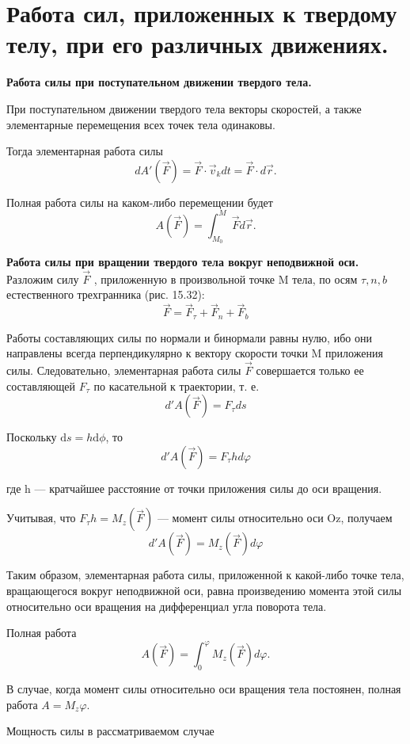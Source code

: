 {\section{Работа сил, приложенных к твердому телу, при его различных движениях.}
\begin{center}
    \par \textbf{Работа  силы  при  поступательном  движении  твердого тела.}
    \par При  поступательном движении твердого тела векторы скоростей, а также элементарные перемещения всех точек тела одинаковы.
    \par Тогда элементарная работа силы
        $${dA}'(\vec{F}) = \vec F\cdot\vec v_kdt = \vec F \cdot d\vec r.$$
    \par Полная работа силы на каком-либо перемещении будет
        $$A(\vec F) = \int_{M_0}^{M} \vec F d \vec r.$$
    \par \textbf{Работа силы при вращении твердого тела вокруг неподвижной оси.} Разложим силу $\vec F$ , приложенную в произвольной точке M тела, по осям $\tau, n, b$ естественного трехгранника (рис. 15.32):
        $$\vec F = \vec F_\tau + \vec F_n + \vec F_b$$
    \par Работы составляющих силы по нормали и бинормали равны нулю, ибо они направлены всегда перпендикулярно к вектору скорости точки M приложения силы. Следовательно, элементарная работа силы $\vec{F}$  совершается только ее составляющей $F_{\tau}$ по касательной к траектории, т. е. 
        $$d'A(\vec F) = F_\tau ds$$
    \par Поскольку $\mathrm{d}s=h\mathrm{d}\phi$, то
        $$d'A(\vec F) = F_\tau hd\varphi$$
    \par где h — кратчайшее расстояние от точки приложения силы до оси вращения.
    \par Учитывая,  что $F_{\tau}h = M_z(\vec F)$  —  момент  силы  относительно  оси  Oz, получаем
        $$d'A(\vec F) = M_z(\vec F)d\varphi$$
    \par Таким  образом,  элементарная  работа  силы,  приложенной  к  какой-либо точке тела, вращающегося вокруг неподвижной оси, равна произведению момента этой силы относительно оси вращения на дифференциал угла поворота тела.
    \par Полная работа
        $$A(\vec F) = \int_{0}^{\varphi} M_z(\vec F) d \varphi.$$
    \par В  случае,  когда  момент  силы  относительно  оси  вращения  тела  постоянен, полная работа $A=M_z\varphi$.
    \par Мощность силы в рассматриваемом случае

\end{center}}
